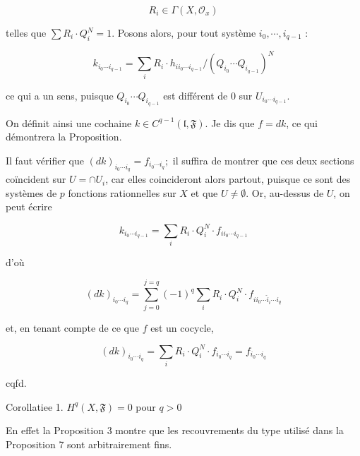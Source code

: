 $$
R_{i} \in \Gamma\left(X, \mathcal{O}_{x}\right)
$$

telles que $\sum R_{i} \cdot Q_{i}^{N}=1 .$ Posons alors, pour tout système $i_{0}, \cdots, i_{q-1}$ :

$$
k_{i_{0} \cdots i_{q-1}}=\sum_{i} R_{i} \cdot h_{i i_{0} \cdots i_{q-1}} /\left(Q_{i_{0}} \cdots Q_{i_{q-1}}\right)^{N}
$$

ce qui a un sens, puisque $Q_{i_{0}} \cdots Q_{i_{q-1}}$ est différent de 0 sur $U_{i_{0} \cdots i_{q-1}}$.

On définit ainsi une cochaine $k \in C^{q-1}(\mathfrak{l}, \mathfrak{F}) .$ Je dis que $f=d k$, ce qui démontrera la Proposition.

Il faut vérifier que $(d k)_{i_{0} \cdots i_{q}}=f_{i_{0} \cdots i_{q}} ;$ il suffira de montrer que ces deux sections coïncident sur $U=\cap U_{i}$, car elles coincideront alors partout, puisque ce sont des systèmes de $p$ fonctions rationnelles sur $X$ et que $U \neq \emptyset$. Or, au-dessus de $U$, on peut écrire

$$
k_{i_{0} \cdots i_{q-1}}=\sum_{i} R_{i} \cdot Q_{i}^{N} \cdot f_{i i_{0} \cdots i_{q-1}}
$$

d'où

$$
(d k)_{i_{0} \cdots i_{q}}=\sum_{j=0}^{j=q}(-1)^{q} \sum_{i} R_{i} \cdot Q_{i}^{N} \cdot f_{i i_{0} \cdots \hat{i}_{i} \cdots i_{q}}
$$


et, en tenant compte de ce que $f$ est un cocycle,

$$
(d k)_{i_{0} \cdots i_{q}}=\sum_{i} R_{i} \cdot Q_{i}^{N} \cdot f_{i_{0} \cdots i_{q}}=f_{i_{0} \cdots i_{q}}
$$

cqfd.

Corollatiee 1. $H^{q}(X, \mathfrak{F})=0$ pour $q>0$

En effet la Proposition 3 montre que les recouvrements du type utilisé dans la Proposition 7 sont arbitrairement fins.

